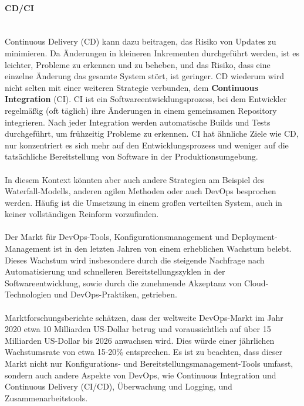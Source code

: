 \paragraph{CD/CI\\\\}
Continuous Delivery (CD) kann dazu beitragen, das Risiko von Updates zu minimieren. Da Änderungen in kleineren Inkrementen durchgeführt werden, ist es leichter, Probleme zu erkennen und zu beheben, und das Risiko, dass eine einzelne Änderung das gesamte System stört, ist geringer. CD wiederum  wird nicht selten mit einer weiteren Strategie verbunden, dem \textbf{Continuous Integration} (CI). CI ist ein Softwareentwicklungsprozess, bei dem Entwickler regelmäßig (oft täglich) ihre Änderungen in einem gemeinsamen Repository integrieren. Nach jeder Integration werden automatische Builds und Tests durchgeführt, um frühzeitig Probleme zu erkennen. CI hat ähnliche Ziele wie CD, nur konzentriert es sich mehr auf den Entwicklungsprozess und weniger auf die tatsächliche Bereitstellung von Software in der Produktionsumgebung. 
\\\\ 
In diesem Kontext könnten aber auch andere Strategien am Beispiel des Waterfall-Modells, anderen agilen Methoden oder auch DevOps besprochen werden. Häufig ist die Umsetzung in einem großen verteilten System, auch in keiner vollständigen Reinform vorzufinden.
\\\\
Der Markt für DevOps-Tools, Konfigurationsmanagement und Deployment-Management ist in den letzten Jahren von einem erheblichen Wachstum belebt. Dieses Wachstum wird insbesondere durch die steigende Nachfrage nach Automatisierung und schnelleren Bereitstellungszyklen in der Softwareentwicklung, sowie durch die zunehmende Akzeptanz von Cloud-Technologien und DevOps-Praktiken, getrieben.
\\\\
Marktforschungsberichte schätzen, dass der weltweite DevOps-Markt im Jahr 2020 etwa 10 Milliarden US-Dollar betrug und voraussichtlich auf über 15 Milliarden US-Dollar bis 2026 anwachsen wird. Dies würde einer jährlichen Wachstumsrate von etwa 15-20\% entsprechen. Es ist zu beachten, dass dieser Markt nicht nur Konfigurations- und Bereitstellungsmanagement-Tools umfasst, sondern auch andere Aspekte von DevOps, wie Continuous Integration und Continuous Delivery (CI/CD), Überwachung und Logging, und Zusammenarbeitstools.
\\\\
